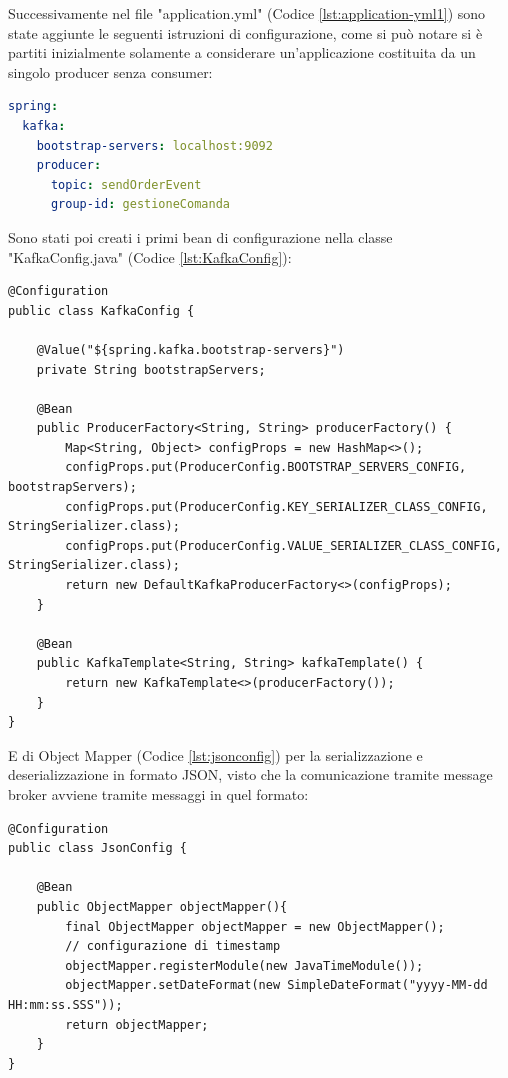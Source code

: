 Successivamente nel file "application.yml" (Codice \vref{lst:application-yml1}) sono state aggiunte le seguenti istruzioni di configurazione, come si può notare si è partiti inizialmente solamente a considerare un'applicazione costituita da un singolo producer senza consumer:
\begin{lstlisting}[language=yaml, caption={Aggiornamento del file `application.yml` per il producer Kafka}, label=lst:application-yml1]
spring:
  kafka:
    bootstrap-servers: localhost:9092
    producer:
      topic: sendOrderEvent
      group-id: gestioneComanda
\end{lstlisting}
Sono stati poi creati i primi bean di configurazione nella classe "KafkaConfig.java" (Codice \vref{lst:KafkaConfig}):
\begin{lstlisting}[style=myJava, 
    caption={Classe di configurazione KafkaConfig.java}, label=lst:KafkaConfig, 
    emph={[2] BOOTSTRAP_SERVERS_CONFIG, KEY_SERIALIZER_CLASS_CONFIG ,  VALUE_SERIALIZER_CLASS_CONFIG, bootstrapServers },
    emphstyle={[2]\color{codeDarkMagenta}},]
@Configuration
public class KafkaConfig {

    @Value("${spring.kafka.bootstrap-servers}")
    private String bootstrapServers;

    @Bean
    public ProducerFactory<String, String> producerFactory() {
        Map<String, Object> configProps = new HashMap<>();
        configProps.put(ProducerConfig.BOOTSTRAP_SERVERS_CONFIG, bootstrapServers);
        configProps.put(ProducerConfig.KEY_SERIALIZER_CLASS_CONFIG, StringSerializer.class);
        configProps.put(ProducerConfig.VALUE_SERIALIZER_CLASS_CONFIG, StringSerializer.class);
        return new DefaultKafkaProducerFactory<>(configProps);
    }

    @Bean
    public KafkaTemplate<String, String> kafkaTemplate() {
        return new KafkaTemplate<>(producerFactory());
    }
}
\end{lstlisting}
E di Object Mapper (Codice \vref{lst:jsonconfig}) per la serializzazione e deserializzazione in formato JSON, visto che la comunicazione tramite message broker avviene tramite messaggi in quel formato:
\begin{lstlisting}[style=myJava, 
    caption={Classe di configurazione JsonConfig.java}, label=lst:jsonconfig,]
@Configuration
public class JsonConfig {

    @Bean
    public ObjectMapper objectMapper(){
        final ObjectMapper objectMapper = new ObjectMapper();
        // configurazione di timestamp
        objectMapper.registerModule(new JavaTimeModule());
        objectMapper.setDateFormat(new SimpleDateFormat("yyyy-MM-dd HH:mm:ss.SSS"));
        return objectMapper;
    }
}
\end{lstlisting}
